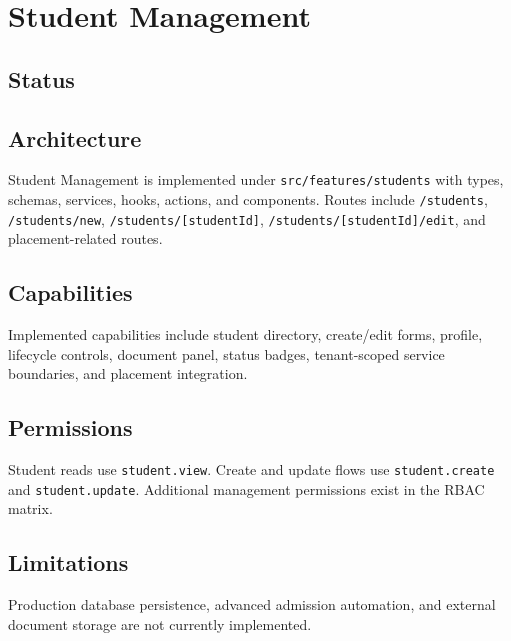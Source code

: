 \chapter{Student Management}
\section{Status}
\statusimplemented

\section{Architecture}
Student Management is implemented under \texttt{src/features/students} with types, schemas, services, hooks, actions, and components. Routes include \texttt{/students}, \texttt{/students/new}, \texttt{/students/[studentId]}, \texttt{/students/[studentId]/edit}, and placement-related routes.



\section{Capabilities}
Implemented capabilities include student directory, create/edit forms, profile, lifecycle controls, document panel, status badges, tenant-scoped service boundaries, and placement integration.

\section{Permissions}
Student reads use \texttt{student.view}. Create and update flows use \texttt{student.create} and \texttt{student.update}. Additional management permissions exist in the RBAC matrix.

\section{Limitations}
Production database persistence, advanced admission automation, and external document storage are not currently implemented.
